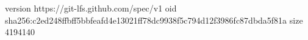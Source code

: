 version https://git-lfs.github.com/spec/v1
oid sha256:c2ed248ffbff5bbfeafd4e13021ff78dc9938f5c794d12f3986fc87dbda5f81a
size 4194140
